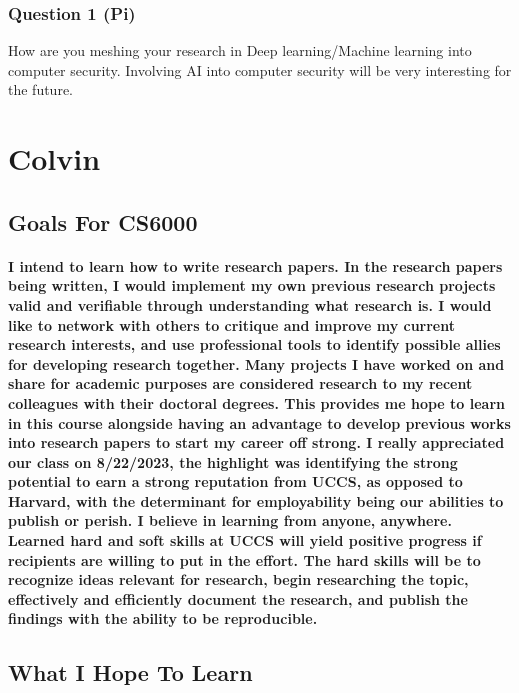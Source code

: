 \documentclass{article}
\begin{document}
\subsubsection{Question 1 (Pi)}
How are you meshing your research in Deep learning/Machine learning into computer security. Involving AI into computer security will be very interesting for the future.

\section{Colvin}
\subsection{Goals For CS6000}
\paragraph{\quad I intend to learn how to write research papers. In the research papers being written, I would implement my own previous research projects valid and verifiable through understanding what research is. I would like to network with others to critique and improve my current research interests, and use professional tools to identify possible allies for developing research together. Many projects I have worked on and share for academic purposes are considered research to my recent colleagues with their doctoral degrees. This provides me hope to learn in this course alongside having an advantage to develop previous works into research papers to start my career off strong. I really appreciated our class on 8/22/2023, the highlight was identifying the strong potential to earn a strong reputation from UCCS, as opposed to Harvard, with the determinant for employability being our abilities to publish or perish. I believe in learning from anyone, anywhere. Learned hard and soft skills at UCCS will yield positive progress if recipients are willing to put in the effort. The hard skills will be to recognize ideas relevant for research, begin researching the topic, effectively and efficiently document the research, and publish the findings with the ability to be reproducible.}
\subsection{What I Hope To Learn}
\end{document}
